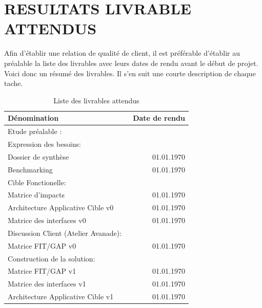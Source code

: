 \documentclass[]{scrartcl}
\begin{document}
\newpage
\section{RESULTATS LIVRABLE ATTENDUS}
Afin d'établir une relation de qualité de client, il est préférable d'établir au préalable la liste des livrables avec leurs dates de rendu avant le début de projet. Voici donc un résumé des livrables. Il s'en suit une courte description de chaque tache. 
\begin{table}[h!]\centering
    \caption{Liste des livrables attendus}
    \begin{tabular}{l r}%
        \toprule
        \textbf{Dénomination} & \ \textbf{Date de rendu} \\%
        \midrule%
       Etude préalable :  & \\ \midrule
       \hspace{0.33cm} Expression des besoins:  & \\ 
       \hspace{0.66cm} Dossier de synthèse & 01.01.1970\\
       \hspace{0.66cm} Benchmarking & 01.01.1970\\
         \hspace{0.33cm}  Cible Fonctionelle: & \\
                \hspace{0.66cm} Matrice d'impacts & 01.01.1970\\ 
       \hspace{0.66cm}  Architecture Applicative Cible v0& 01.01.1970\\
       \hspace{0.66cm}  Matrice des interfaces v0 & 01.01.1970\\ 
         \hspace{0.33cm}   Discussion Client (Atelier Avanade): & \\
                \hspace{0.66cm}  Matrice FIT/GAP v0& 01.01.1970\\
         \hspace{0.33cm}   Construction de la solution: & \\
                \hspace{0.66cm} Matrice FIT/GAP v1& 01.01.1970\\ 
       \hspace{0.66cm} Matrice des interfaces v1& 01.01.1970 \\
       \hspace{0.66cm}  Architecture Applicative Cible v1& 01.01.1970\\ 

\end{tabular}
\end{table}
\end{document}
